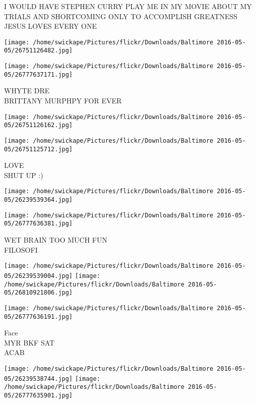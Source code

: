 \documentclass[10pt,letterpaper]{article}
\begin{document}
I WOULD HAVE STEPHEN CURRY PLAY ME IN MY MOVIE ABOUT MY TRIALS AND SHORTCOMING ONLY TO ACCOMPLISH GREATNESS\\
JESUS LOVES EVERY ONE\\
\pagebreak

\texttt{[image: /home/swickape/Pictures/flickr/Downloads/Baltimore 2016-05-05/26751126482.jpg]}

\vspace{0.25in}
\texttt{[image: /home/swickape/Pictures/flickr/Downloads/Baltimore 2016-05-05/26777637171.jpg]}

WHYTE DRE\\
BRITTANY MURPHPY FOR EVER\\
\pagebreak

\texttt{[image: /home/swickape/Pictures/flickr/Downloads/Baltimore 2016-05-05/26751126162.jpg]}

\vspace{0.25in}
\texttt{[image: /home/swickape/Pictures/flickr/Downloads/Baltimore 2016-05-05/26751125712.jpg]}

LOVE\\
SHUT UP :)\\
\pagebreak

\texttt{[image: /home/swickape/Pictures/flickr/Downloads/Baltimore 2016-05-05/26239539364.jpg]}

\vspace{0.25in}
\texttt{[image: /home/swickape/Pictures/flickr/Downloads/Baltimore 2016-05-05/26777636381.jpg]}

WET BRAIN TOO MUCH FUN\\
FILOSOFI\\
\pagebreak

\texttt{[image: /home/swickape/Pictures/flickr/Downloads/Baltimore 2016-05-05/26239539004.jpg]}
\texttt{[image: /home/swickape/Pictures/flickr/Downloads/Baltimore 2016-05-05/26810921806.jpg]}

\vspace{0.25in}
\texttt{[image: /home/swickape/Pictures/flickr/Downloads/Baltimore 2016-05-05/26777636191.jpg]}

Face\\
MYR BKF SAT\\
ACAB\\
\pagebreak

\texttt{[image: /home/swickape/Pictures/flickr/Downloads/Baltimore 2016-05-05/26239538744.jpg]}
\texttt{[image: /home/swickape/Pictures/flickr/Downloads/Baltimore 2016-05-05/26777635901.jpg]}
\end{document}

